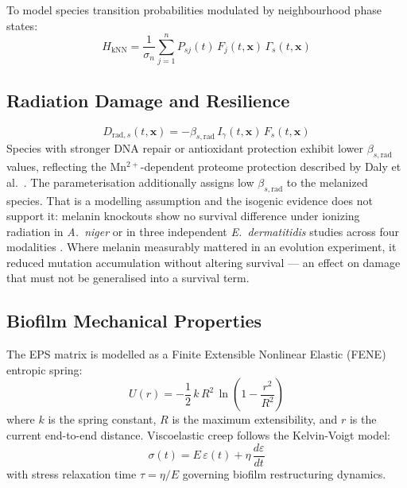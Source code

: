 \documentclass[11pt]{article}
\begin{document}
To model species transition probabilities modulated by neighbourhood phase states:
\begin{equation}
\label{eq:knn}
H_{\mathrm{kNN}} = \frac{1}{\sigma_n}\sum_{j=1}^{n} P_{sj}(t)\,F_j(t,\mathbf{x})\,\Gamma_s(t,\mathbf{x})
\end{equation}

\subsection{Radiation Damage and Resilience}

\begin{equation}
\label{eq:damage}
D_{\mathrm{rad},s}(t,\mathbf{x}) = -\beta_{s,\mathrm{rad}}\,I_\gamma(t,\mathbf{x})\,F_s(t,\mathbf{x})
\end{equation}
Species with stronger DNA repair or antioxidant protection exhibit lower $\beta_{s,\mathrm{rad}}$
values, reflecting the Mn$^{2+}$-dependent proteome protection described by Daly et al.\
\cite{daly2010}. The parameterisation additionally assigns low $\beta_{s,\mathrm{rad}}$ to the
melanized species. That is a modelling assumption and the isogenic evidence does not support it:
melanin knockouts show no survival difference under ionizing radiation in \textit{A.\ niger}
\cite{cortesao2020} or in three independent \textit{E.\ dermatitidis} studies across four
modalities \cite{audit2026}. Where melanin measurably mattered in an evolution experiment, it
reduced mutation accumulation without altering survival --- an effect on damage that must not be
generalised into a survival term.

\subsection{Biofilm Mechanical Properties}

The EPS matrix is modelled as a Finite Extensible Nonlinear Elastic (FENE) entropic spring:
\begin{equation}
\label{eq:fene}
U(r) = -\frac{1}{2}\,k\,R^2\,\ln\!\left(1 - \frac{r^2}{R^2}\right)
\end{equation}
where $k$ is the spring constant, $R$ is the maximum extensibility, and $r$ is the current
end-to-end distance.  Viscoelastic creep follows the Kelvin-Voigt model:
\begin{equation}
\label{eq:kelvinvoigt}
\sigma(t) = E\,\varepsilon(t) + \eta\,\frac{d\varepsilon}{dt}
\end{equation}
with stress relaxation time $\tau = \eta/E$ governing biofilm restructuring dynamics.
\end{document}
